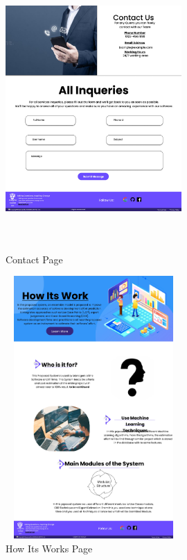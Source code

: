 \begin{figure}[H]
    \centering 
\includegraphics[height=10cm, width=0.6\textwidth]{./images/prototype/0002}
\caption{Contact Page}
\label{fig:prototype1}

\includegraphics[height=10cm, width=0.6\textwidth]{./images/prototype/0009}
\centering 
\caption{How Its Works Page}
\label{fig:prototype1}
\end{figure}
